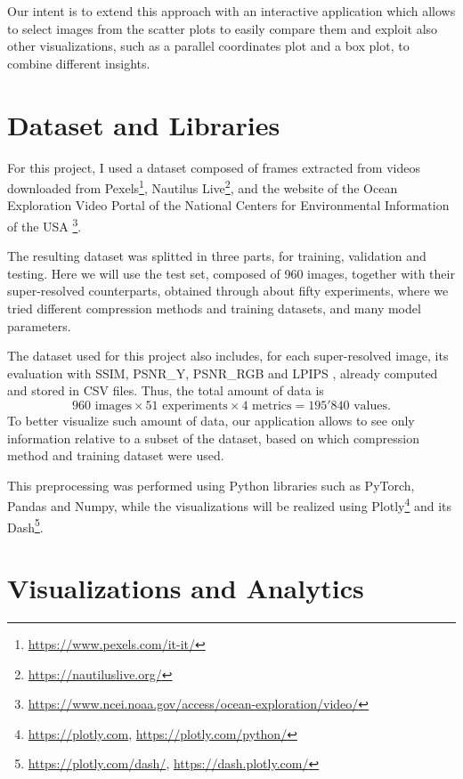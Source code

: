 \documentclass[12pt]{article}
\begin{document}
	Our intent is to extend this approach with an interactive application which allows to select images from the scatter plots to easily compare them and exploit also other visualizations, such as a parallel coordinates plot and a box plot, to combine different insights.


	\section{Dataset and Libraries}

	For this project, I used a dataset composed of frames extracted from videos downloaded from Pexels\footnote{\url{https://www.pexels.com/it-it/}}, Nautilus Live\footnote{\url{https://nautiluslive.org/}}, and the website of the Ocean Exploration Video Portal of the National Centers for Environmental Information of the USA \cite{pacific}\footnote{\url{https://www.ncei.noaa.gov/access/ocean-exploration/video/}}.

	The resulting dataset was splitted in three parts, for training, validation and testing. Here we will use the test set, composed of 960 images, together with their super-resolved counterparts, obtained through about fifty experiments, where we tried different compression methods and training datasets, and many model parameters.

	The dataset used for this project also includes, for each super-resolved image, its evaluation with SSIM, PSNR\_Y, PSNR\_RGB and LPIPS \cite{lpips}, already computed and stored in CSV files. Thus, the total amount of data is
	\begin{equation*}
		960 \text{ images} \times 51 \text{ experiments} \times 4 \text{ metrics} = 195'840 \text{ values}.
	\end{equation*}
	To better visualize such amount of data, our application allows to see only information relative to a subset of the dataset, based on which compression method and training dataset were used.

	This preprocessing was performed using Python libraries such as PyTorch, Pandas and Numpy, while the visualizations will be realized using Plotly\footnote{\url{https://plotly.com}, \url{https://plotly.com/python/}} and its Dash\footnote{\url{https://plotly.com/dash/}, \url{https://dash.plotly.com/}}.


	\section{Visualizations and Analytics}
\end{document}
